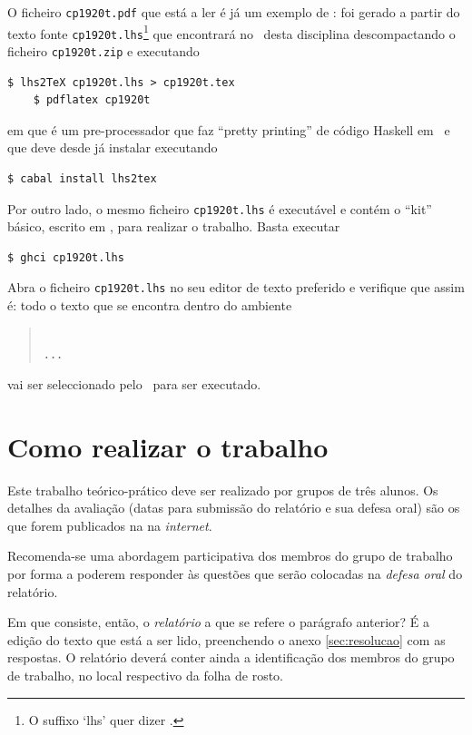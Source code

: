 \documentclass[a4paper]{article}
\begin{document}
O ficheiro \texttt{cp1920t.pdf} que está a ler é já um exemplo de : foi gerado a partir do texto fonte \texttt{cp1920t.lhs}\footnote{O
suffixo `lhs' quer dizer \emph{}.} que encontrará
no \MaterialPedagogico\ desta disciplina descompactando o ficheiro \texttt{cp1920t.zip}
e executando
\begin{Verbatim}[fontsize=\small]
    $ lhs2TeX cp1920t.lhs > cp1920t.tex
    $ pdflatex cp1920t
\end{Verbatim}
em que \href{https://hackage.haskell.org/package/lhs2tex}{\texttt\LhsToTeX} é
um pre-processador que faz ``pretty printing''
de código Haskell em \Latex\ e que deve desde já instalar executando
\begin{Verbatim}[fontsize=\small]
    $ cabal install lhs2tex
\end{Verbatim}
Por outro lado, o mesmo ficheiro \texttt{cp1920t.lhs} é executável e contém
o ``kit'' básico, escrito em \Haskell, para realizar o trabalho. Basta executar
\begin{Verbatim}[fontsize=\small]
    $ ghci cp1920t.lhs
\end{Verbatim}


\noindent Abra o ficheiro \texttt{cp1920t.lhs} no seu editor de texto preferido
e verifique que assim é: todo o texto que se encontra dentro do ambiente
\begin{quote}\small\tt
{}
\\ ... \\
\end{quote}
vai ser seleccionado pelo \GHCi\ para ser executado.

\section{Como realizar o trabalho}
Este trabalho teórico-prático deve ser realizado por grupos de três alunos.
Os detalhes da avaliação (datas para submissão do relatório e sua defesa
oral) são os que forem publicados na  na \emph{internet}.

Recomenda-se uma abordagem participativa dos membros do grupo
de trabalho por forma a poderem responder às questões que serão colocadas
na \emph{defesa oral} do relatório.

Em que consiste, então, o \emph{relatório} a que se refere o parágrafo anterior?
É a edição do texto que está a ser lido, preenchendo o anexo \ref{sec:resolucao}
com as respostas. O relatório deverá conter ainda a identificação dos membros
do grupo de trabalho, no local respectivo da folha de rosto.
\end{document}
